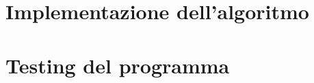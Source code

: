 \documentclass[11pt]{article}
\theoremstyle{definition}
\begin{document}
\newpage

\section{Implementazione dell'algoritmo}

\newpage

\section{Testing del programma}
\end{document}
